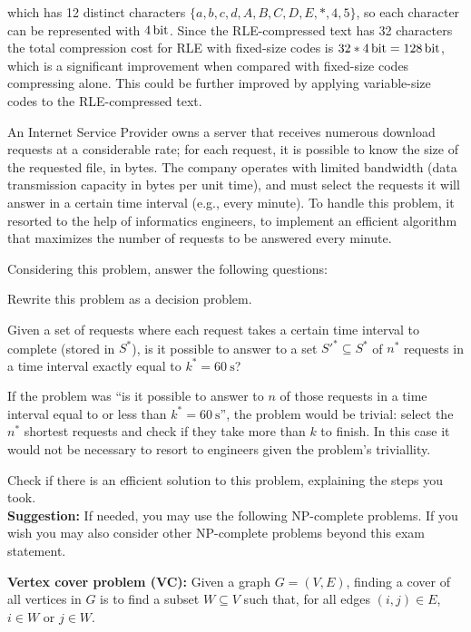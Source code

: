 {which has 12 distinct characters $\{a, b, c, d, A, B, C, D, E, *, 4, 5\}$, so each character can be represented with $\SI{4}{\bit}$. Since the RLE-compressed text has 32 characters the total compression cost for RLE with fixed-size codes is $32*\SI{4}{\bit} = \SI{128}{\bit}$, which is a significant improvement when compared with fixed-size codes compressing alone. This could be further improved by applying variable-size codes to the RLE-compressed text.

An Internet Service Provider owns a server that receives numerous download requests at a considerable rate; for each request, it is possible to know the size of the requested file, in bytes. The company operates with limited bandwidth (data transmission capacity in bytes per unit time), and must select the requests it will answer in a certain time interval (e.g., every minute). To handle this problem, it resorted to the help of informatics engineers, to implement an efficient algorithm that maximizes the number of requests to be answered every minute.

Considering this problem, answer the following questions:

Rewrite this problem as a decision problem.

\ansseparator

Given a set of requests where each request takes a certain time interval to complete (stored in $S^*$), is it possible to answer to a set $S'^* \subseteq S^*$ of $n^*$ requests in a time interval exactly equal to $k^* = \SI{60}{\second}$?

\remark If the problem was ``is it possible to answer to $n$ of those requests in a time interval equal to or less than $k^* = \SI{60}{\second}$'', the problem would be trivial: select the $n^*$ shortest requests and check if they take more than $k$ to finish. In this case it would not be necessary to resort to engineers given the problem's triviallity.

Check if there is an efficient solution to this problem, explaining the steps you took.\\

\textbf{Suggestion: } If needed, you may use the following NP-complete problems. If you wish you may also consider other NP-complete problems beyond this exam statement.

\textbf{Vertex cover problem (VC): } Given a graph $G=(V,E)$, finding a cover of all vertices in $G$ is to find a subset $W \subseteq V$ such that, for all edges $(i,j) \in E$, $i \in W$ or $j \in W$.

}
